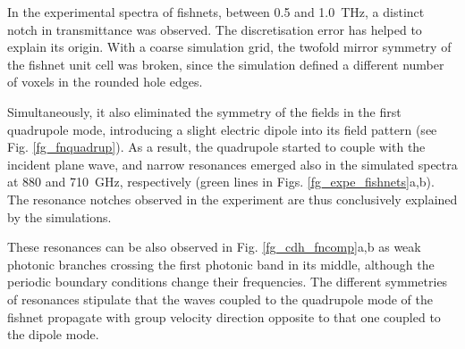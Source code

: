 In the experimental spectra of fishnets,  between 0.5 and 1.0~THz, a distinct notch in transmittance was observed. The discretisation error has helped to explain its origin. With a coarse simulation grid, the twofold mirror symmetry of the fishnet unit cell was broken, since the simulation defined a different number of voxels in the rounded hole edges. 

Simultaneously, it also eliminated the symmetry of the fields in the first quadrupole mode, introducing a slight electric dipole into its field pattern (see Fig. \ref{fg_fnquadrup}). As a result, the quadrupole started to couple with the incident plane wave, and narrow resonances emerged also in the simulated spectra at 880 and 710~GHz, respectively (green lines in Figs. \ref{fg_expe_fishnets}a,b). The resonance notches observed in the experiment are thus conclusively explained by the simulations. %

These resonances can be also observed in Fig. \ref{fg_cdh_fncomp}a,b as weak photonic branches crossing the first photonic band in its middle, although the periodic boundary conditions change their frequencies. The different symmetries of resonances stipulate that the waves coupled to the quadrupole mode of the fishnet propagate with group velocity direction opposite to that one coupled to the dipole mode.


